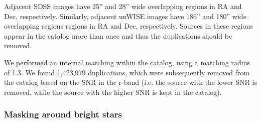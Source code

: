 \documentclass[apj,iop]{emulateapj}
\begin{document}
Adjacent SDSS images have 25'' and 28'' wide overlapping regions in RA and Dec, respectively. Similarly, adjacent unWISE images have 186'' and 180'' wide overlapping regions regions in RA and Dec, respectively. Sources in these regions appear in the catalog more than once and thus the duplications should be removed. 

We performed an internal matching within the catalog, using a matching radius of 1.3\arcsec. We found 1,423,979 duplications, which were subsequently removed from the catalog based on the SNR in the r-band (i.e. the source with the lower SNR is removed, while the source with the higher SNR is kept in the catalog).

\subsubsection{Masking around bright stars}

\end{document}

